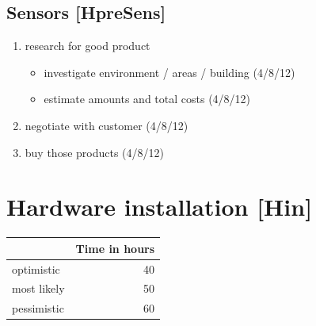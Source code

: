 \documentclass
[
 12pt, %
       DIV12,
       a4paper, %
       oneside, %
       titlepage, %
       parskip=half, %
       headings=normal, %
       listof=totoc, %
       bibliography=totoc, %
       index=totoc, %
       captions=tableheading, %
       ]{scrreprt}
\begin{document}
\section{Sensors [HpreSens]}
\label{sec:org6352bec}

\begin{enumerate}
\item research for good product
\begin{itemize}
\item investigate environment / areas / building (4/8/12)
\item estimate amounts and total costs (4/8/12)
\end{itemize}
\item negotiate with customer (4/8/12)
\item buy those products (4/8/12)
\end{enumerate}



\chapter{Hardware installation [Hin]}
\label{sec:org2cae8f9}

\begin{center}
\begin{tabular}{|l|r|}
	\hline
	& Time in hours\\
	\hline
	optimistic & 40\\
	\hline
	most likely & 50\\
	\hline
	pessimistic & 60\\
	\hline
\end{tabular}
\end{center}
\end{document}
